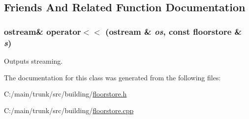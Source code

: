\subsection{Friends And Related Function Documentation}
\hypertarget{classfloorstore_a2f4c08f25a5535c62d3d780806d5ce0b}{
\subsubsection[{operator$<$$<$}]{\setlength{\rightskip}{0pt plus 5cm}ostream\& operator$<$$<$ (ostream \& {\em os}, \/  const {\bf floorstore} \& {\em s})}}
\label{classfloorstore_a2f4c08f25a5535c62d3d780806d5ce0b}


Outputs streaming. 

The documentation for this class was generated from the following files:\begin{DoxyCompactItemize}
\item 
C:/main/trunk/src/building/\hyperlink{floorstore_8h}{floorstore.h}\item 
C:/main/trunk/src/building/\hyperlink{floorstore_8cpp}{floorstore.cpp}\end{DoxyCompactItemize}
